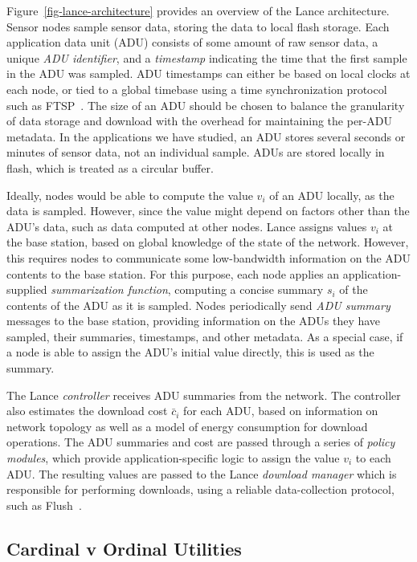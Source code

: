 Figure~\ref{fig-lance-architecture} provides an overview of the Lance
architecture. Sensor nodes sample sensor data, storing the data to local
flash storage. Each application data unit (ADU) consists of some amount of
raw sensor data, a unique {\em ADU identifier}, and a {\em timestamp}
indicating the time that the first sample in the ADU was sampled. ADU
timestamps can either be based on local clocks at each node, or tied to a
global timebase using a time synchronization protocol such as
FTSP~\cite{ftsp}. The size of an ADU should be chosen to balance the
granularity of data storage and download with the overhead for maintaining
the per-ADU metadata. In the applications we have studied, an ADU stores
several seconds or minutes of sensor data, not an individual sample. ADUs are
stored locally in flash, which is treated as a circular buffer.

Ideally, nodes would be able to compute the value $v_i$ of an ADU locally, as
the data is sampled. However, since the value might depend on factors other
than the ADU's data, such as data computed at other nodes. Lance assigns
values $v_i$ at the base station, based on global knowledge of the state of
the network. However, this requires nodes to communicate some low-bandwidth
information on the ADU contents to the base station.  For this purpose, each
node applies an application-supplied {\em summarization function}, computing
a concise summary $s_i$ of the contents of the ADU as it is sampled.  Nodes
periodically send {\em ADU summary} messages to the base station, providing
information on the ADUs they have sampled, their summaries, timestamps, and
other metadata. As a special case, if a node is able to assign the ADU's
initial value directly, this is used as the summary.

The Lance {\em controller} receives ADU summaries from the network.  The
controller also estimates the download cost $\bar{c}_i$ for each ADU, based
on information on network topology as well as a model of energy consumption
for download operations. The ADU summaries and cost are passed through a
series of {\em policy modules}, which provide application-specific logic to
assign the value $v_i$ to each ADU.  The resulting values are passed to the
Lance {\em download manager} which is responsible for performing downloads,
using a reliable data-collection protocol, such as
Flush~\cite{flush-sensys07}.

\subsection{Cardinal v Ordinal Utilities}


